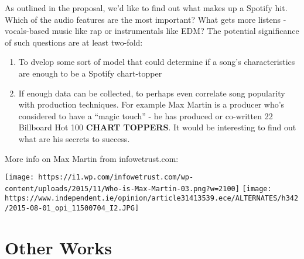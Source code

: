 \documentclass[11pt]{article}
\makeatletter
\def\maxwidth{\ifdim\Gin@nat@width>\linewidth\linewidth
    \else\Gin@nat@width\fi}
\let\Oldincludegraphics\includegraphics
\renewcommand{\includegraphics}[1]{\Oldincludegraphics[width=.8\maxwidth]{#1}}
\providecommand{\tightlist}{%
      \setlength{\itemsep}{0pt}\setlength{\parskip}{0pt}}
\makeatother
\begin{document}
As outlined in the proposal, we'd like to find out what makes up a
Spotify hit. Which of the audio features are the most important? What
gets more listens - vocals-based music like rap or instrumentals like
EDM? The potential significance of such questions are at least two-fold:

\begin{enumerate}
\def\labelenumi{\arabic{enumi}.}
\tightlist
\item
  To dvelop some sort of model that could determine if a song's
  characteristics are enough to be a Spotify chart-topper
\item
  If enough data can be collected, to perhaps even correlate song
  popularity with production techniques. For example Max Martin is a
  producer who's considered to have a ``magic touch'' - he has produced
  or co-written 22 Billboard Hot 100 \textbf{CHART TOPPERS}. It would be
  interesting to find out what are his secrets to success.
\end{enumerate}

More info on Max Martin from infowetrust.com:

\texttt{[image: https://i1.wp.com/infowetrust.com/wp-content/uploads/2015/11/Who-is-Max-Martin-03.png?w=2100]}
\texttt{[image: https://www.independent.ie/opinion/article31413539.ece/ALTERNATES/h342/2015-08-01\_opi\_11500704\_I2.JPG]}

\hypertarget{other-works}{%
\section{Other Works}\label{other-works}}
\end{document}
